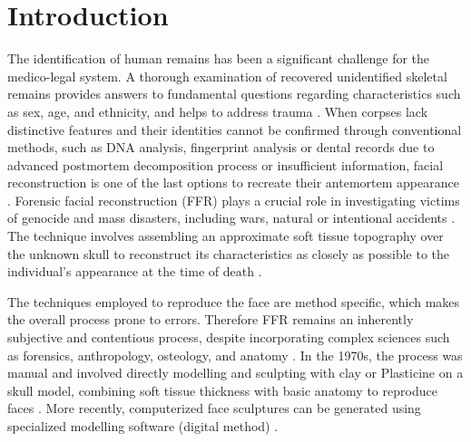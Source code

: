 \documentclass[journal,article,submit,pdftex,moreauthors]{Definitions/mdpi}
\begin{document}
\section{Introduction}
The identification of human remains has been a significant challenge for the medico-legal system. A thorough examination of recovered unidentified skeletal remains provides answers to fundamental questions regarding characteristics such as sex, age, and ethnicity, and helps to address trauma \cite{ref1}. When corpses lack distinctive features and their identities cannot be confirmed through conventional methods, such as DNA analysis, fingerprint analysis or dental records due to advanced postmortem decomposition process or insufficient information, facial reconstruction is one of the last options to recreate their antemortem appearance \citep{ref2,ref3,ref4,ref5}.
Forensic facial reconstruction (FFR) plays a crucial role in investigating victims of genocide and mass disasters, including wars, natural or intentional accidents \cite{ref4}.
The technique involves assembling an approximate soft tissue topography over the unknown skull to reconstruct its characteristics as closely as possible to the individual's appearance at the time of death \cite{ref3}. %

The techniques employed to reproduce the face are method specific, which makes the overall process prone to errors. %
Therefore FFR remains an inherently subjective and contentious process, despite incorporating complex sciences such as forensics, anthropology, osteology, and anatomy \cite{ref6}. In the 1970s, the process was manual and involved directly modelling and sculpting with clay or Plasticine on a skull model, combining soft tissue thickness with basic anatomy to reproduce faces \citep{ref7,ref8,ref9,ref10}. More recently, computerized face sculptures can be generated using specialized modelling software (digital method) \cite{ref11}.
\end{document}
